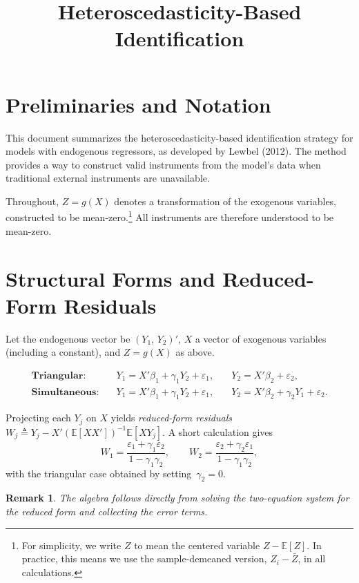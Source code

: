 \documentclass{article}
\newcommand{\E}{\mathbb{E}}
\theoremstyle{plain}
\newtheorem{remark}{Remark}
\begin{document}
\title{Heteroscedasticity-Based Identification}
\maketitle

\section{Preliminaries and Notation}

This document summarizes the heteroscedasticity-based identification strategy for models with endogenous regressors, as developed by Lewbel (2012). The method provides a way to construct valid instruments from the model's data when traditional external instruments are unavailable.

Throughout, \(Z=g(X)\) denotes a transformation of the exogenous variables, constructed to be mean-zero.\footnote{For simplicity, we write \(Z\) to mean the centered variable \(Z - \E[Z]\). In practice, this means we use the sample-demeaned version, \(Z_i - \bar Z\), in all calculations.}
All instruments are therefore understood to be mean-zero.

\section{Structural Forms and Reduced-Form Residuals}

Let the endogenous vector be \((Y_1,\,Y_2)'\), $X$ a vector of exogenous
variables (including a constant), and $Z=g(X)$ as above.

\begin{align*}
\textbf{Triangular:}\quad
& Y_1 = X'\beta_1 + \gamma_1 Y_2 + \varepsilon_1,
&\quad
  Y_2 = X'\beta_2 + \varepsilon_2, \\[3pt]
\textbf{Simultaneous:}\quad
& Y_1 = X'\beta_1 + \gamma_1 Y_2 + \varepsilon_1,
&\quad
  Y_2 = X'\beta_2 + \gamma_2 Y_1 + \varepsilon_2.
\end{align*}

Projecting each \(Y_j\) on \(X\) yields \emph{reduced-form residuals}
\(W_j\triangleq Y_j - X'(\E[XX'])^{-1}\E[XY_j]\).
A short calculation gives
\[
W_1 = \frac{\varepsilon_1+\gamma_1\varepsilon_2}{1-\gamma_1\gamma_2},\qquad
W_2 = \frac{\varepsilon_2+\gamma_2\varepsilon_1}{1-\gamma_1\gamma_2},
\]
with the triangular case obtained by setting~\(\gamma_2=0\).

\begin{remark}
The algebra follows directly from solving the two-equation system for the
reduced form and collecting the error terms.
\end{remark}
\end{document}
